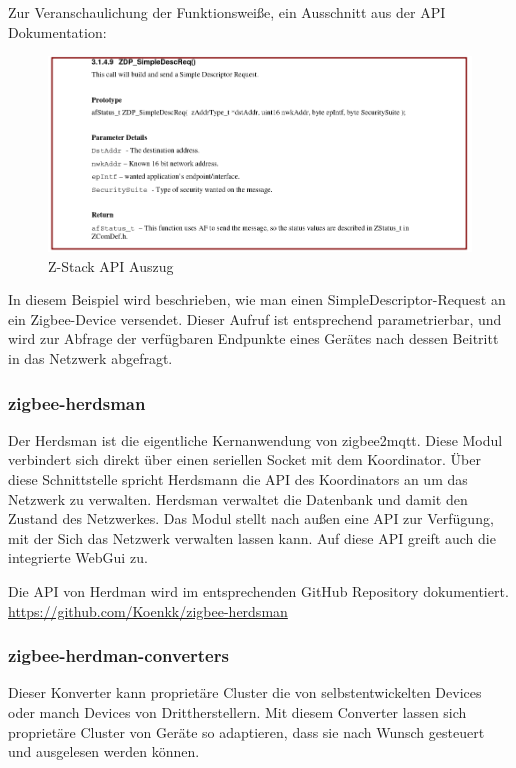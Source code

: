 Zur Veranschaulichung der Funktionsweiße, ein Ausschnitt aus der API Dokumentation:

\begin{figure}[H]
  \centering
  \includegraphics[width=1\textwidth]{media/z-stack-api-excerpt.png}
  \caption{Z-Stack API Auszug}
\end{figure}

In diesem Beispiel wird beschrieben, wie man einen SimpleDescriptor-Request an ein Zigbee-Device versendet. Dieser Aufruf ist entsprechend parametrierbar,
und wird zur Abfrage der verfügbaren Endpunkte eines Gerätes nach dessen Beitritt in das Netzwerk abgefragt.

\subsubsection{zigbee-herdsman}

Der Herdsman ist die eigentliche Kernanwendung von zigbee2mqtt. Diese Modul verbindert sich direkt über einen seriellen Socket mit dem Koordinator. Über diese Schnittstelle
spricht Herdsmann die API des Koordinators an um das Netzwerk zu verwalten. Herdsman verwaltet die Datenbank und damit den Zustand des Netzwerkes. Das Modul stellt nach außen
eine API zur Verfügung, mit der Sich das Netzwerk verwalten lassen kann. Auf diese API greift auch die integrierte WebGui zu.

Die API von Herdman wird im entsprechenden GitHub Repository dokumentiert.
\url{https://github.com/Koenkk/zigbee-herdsman}

\subsubsection{zigbee-herdman-converters}

Dieser Konverter kann proprietäre Cluster die von selbstentwickelten Devices oder manch Devices von Drittherstellern. Mit diesem Converter lassen sich proprietäre Cluster von Geräte
so adaptieren, dass sie nach Wunsch gesteuert und ausgelesen werden können.

